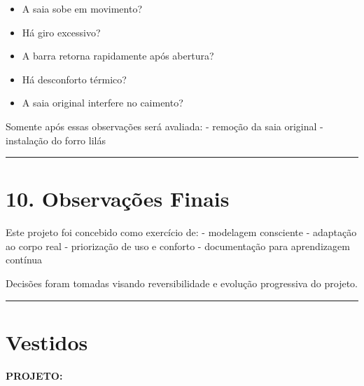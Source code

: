\documentclass[
  10pt,oneside]{article}
\providecommand{\tightlist}{%
  \setlength{\itemsep}{0pt}\setlength{\parskip}{0pt}}
\begin{document}
\begin{itemize}
\tightlist
\item
  A saia sobe em movimento?
\item
  Há giro excessivo?
\item
  A barra retorna rapidamente após abertura?
\item
  Há desconforto térmico?
\item
  A saia original interfere no caimento?
\end{itemize}

Somente após essas observações será avaliada:
- remoção da saia original
- instalação do forro lilás

\begin{center}\rule{0.5\linewidth}{0.5pt}\end{center}

\section{10. Observações Finais}\label{observauxe7uxf5es-finais}

Este projeto foi concebido como exercício de:
- modelagem consciente
- adaptação ao corpo real
- priorização de uso e conforto
- documentação para aprendizagem contínua

Decisões foram tomadas visando reversibilidade e evolução progressiva do projeto.

\begin{center}\rule{0.5\linewidth}{0.5pt}\end{center}

\section{Vestidos}\label{vestidos}

\vspace*{-1cm}

\begin{center}
\normalsize\bfseries PROJETO:
\end{center}

\vspace{0.8cm}
\end{document}
